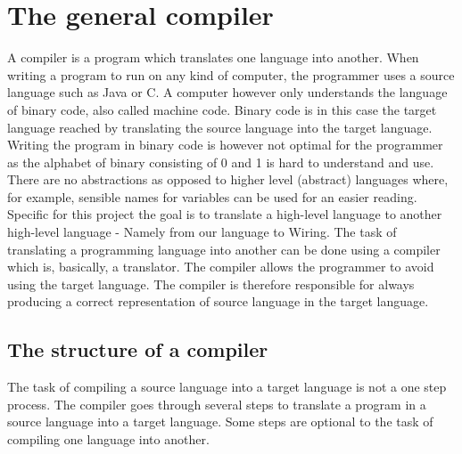 \section{The general compiler}
A compiler is a program which translates one language into another. When writing a program to run on any kind of computer, the programmer uses a source language such as Java or C. A computer however only understands the language of binary code, also called machine code. Binary code is in this case the target language reached by translating the source language into the target language. Writing the program in binary code is however not optimal for the programmer as the alphabet of binary consisting of 0 and 1 is hard to understand and use. There are no abstractions as opposed to higher level (abstract) languages where, for example, sensible names for variables can be used for an easier reading.\\
Specific for this project the goal is to translate a high-level language to another high-level language - Namely from our language to Wiring. The task of translating a programming language into another can be done using a compiler which is, basically, a translator. The compiler allows the programmer to avoid using the target language. The compiler is therefore responsible for always producing a correct representation of source language in the target language.

\subsection{The structure of a compiler}
The task of compiling a source language into a target language is not a one step process. The compiler goes through several steps to translate a program in a source language into a target language. Some steps are optional to the task of compiling one language into another.\cite{compiler:structure}\\

